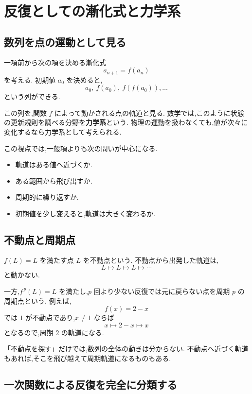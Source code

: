 
\section{反復としての漸化式と力学系}

\subsection{数列を点の運動として見る}

一項前から次の項を決める漸化式
\[
  a_{n+1}=f(a_n)
\]
を考える.
初期値 $a_0$ を決めると,
\[
  a_0,\ f(a_0),\ f(f(a_0)),\ldots
\]
という列ができる.

この列を,関数 $f$ によって動かされる点の軌道と見る.
数学では,このように状態の更新規則を調べる分野を\textbf{力学系}という.
物理の運動を扱わなくても,値が次々に変化するなら力学系として考えられる.

この視点では,一般項よりも次の問いが中心になる.

\begin{itemize}
  \item 軌道はある値へ近づくか.
  \item ある範囲から飛び出すか.
  \item 周期的に繰り返すか.
  \item 初期値を少し変えると,軌道は大きく変わるか.
\end{itemize}

\subsection{不動点と周期点}

$f(L)=L$ を満たす点 $L$ を不動点という.
不動点から出発した軌道は,
\[
  L\longmapsto L\longmapsto L\longmapsto\cdots
\]
と動かない.

一方,$f^{\,p}(L)=L$ を満たし,$p$ 回より少ない反復では元に戻らない点を周期 $p$ の周期点という.
例えば,
\[
  f(x)=2-x
\]
では $1$ が不動点であり,$x\neq1$ ならば
\[
  x\longmapsto 2-x\longmapsto x
\]
となるので,周期 $2$ の軌道になる.

「不動点を探す」だけでは,数列の全体の動きは分からない.
不動点へ近づく軌道もあれば,そこを飛び越えて周期軌道になるものもある.

\subsection{一次関数による反復を完全に分類する}

